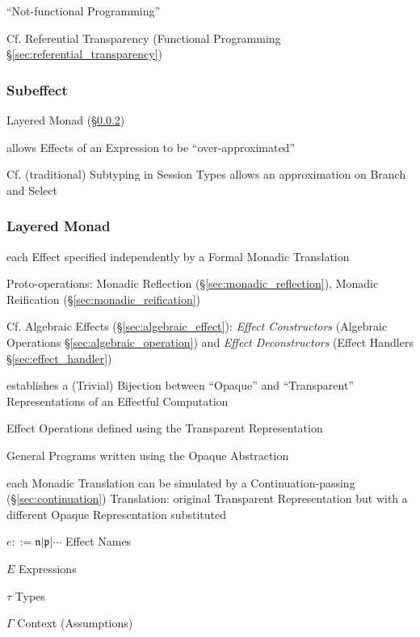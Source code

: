 ``Not-functional Programming''

\fist Cf. Referential Transparency
(Functional Programming \S\ref{sec:referential_transparency})



\subsubsection{Subeffect}\label{sec:subeffect}

Layered Monad (\S\ref{sec:layered_monad}) \cite{filinski99}

allows Effects of an Expression to be ``over-approximated''
\cite{orchard-yoshida16}

\fist Cf. (traditional) Subtyping in Session Types allows an
approximation on Branch and Select \cite{orchard-yoshida16}



\subsubsection{Layered Monad}\label{sec:layered_monad}
\cite{filinski99}

each Effect specified independently by a Formal Monadic Translation

Proto-operations: Monadic Reflection (\S\ref{sec:monadic_reflection}),
Monadic Reification (\S\ref{sec:monadic_reification})

\fist Cf. Algebraic Effects (\S\ref{sec:algebraic_effect}):
\emph{Effect Constructors} (Algebraic Operations
\S\ref{sec:algebraic_operation}) and \emph{Effect Deconstructors}
(Effect Handlers \S\ref{sec:effect_handler})


establishes a (Trivial) Bijection between ``Opaque'' and
``Transparent'' Representations of an Effectful Computation

Effect Operations defined using the Transparent Representation

General Programs written using the Opaque Abstraction

each Monadic Translation can be simulated by a Continuation-passing
(\S\ref{sec:continuation}) Translation: original Transparent
Representation but with a different Opaque Representation substituted

$e ::= \mathfrak{n} | \mathfrak{p} | \cdots$ Effect Names

$E$ Expressions

$\tau$ Types

$\Gamma$ Context (Assumptions)

